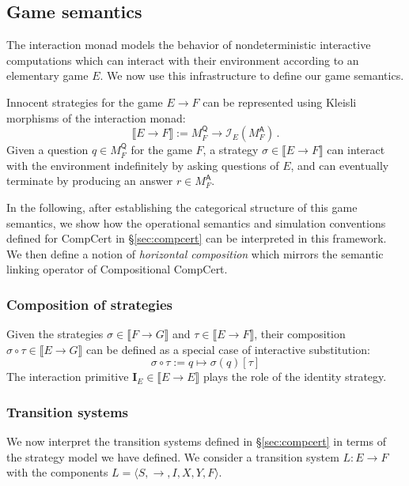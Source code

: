 \documentclass[sigplan,10pt,review,anonymous]{acmart}
\newcommand{\kw}[1]{\ensuremath{ \mathsf{#1} }}
\begin{document}

\subsection{Game semantics}

The interaction monad
models the behavior of
nondeterministic interactive computations
which can interact with their environment
according to an elementary game $E$.
We now use this infrastructure
to define our game semantics.

Innocent strategies for the game $E \rightarrow F$
can be represented using Kleisli morphisms of
the interaction monad:
\[
  \llbracket E \rightarrow F \rrbracket :=
  M_F^\kw{Q} \rightarrow \mathcal{I}_E(M_F^\kw{A}) \,.
\]
Given a question $q \in M_F^\kw{Q}$ for the game $F$,
a strategy $\sigma \in \llbracket E \rightarrow F \rrbracket$
can interact with the environment
indefinitely by asking questions of $E$,
and can eventually terminate by producing an answer $r \in M_F^\kw{A}$.

In the following,
after establishing the categorical structure
of this game semantics,
we show how
the operational semantics
and simulation conventions
defined for CompCert in \S\ref{sec:compcert}
can be interpreted in this framework.
We then define a notion of \emph{horizontal composition}
which mirrors the semantic linking operator
of Compositional CompCert.

\subsubsection{Composition of strategies}

Given the strategies
$\sigma \in \llbracket F \rightarrow G \rrbracket$ and
$\tau \in \llbracket E \rightarrow F \rrbracket$,
their composition
$\sigma \circ \tau \in \llbracket E \rightarrow G \rrbracket$
can be defined as a special case of interactive substitution:
\[
    \sigma \circ \tau := q \mapsto \sigma(q)[\tau]
\]
The interaction primitive
$\mathbf{I}_E \in \llbracket E \rightarrow E \rrbracket$
plays the role of the identity strategy.

\subsubsection{Transition systems}

We now interpret the transition systems defined in \S\ref{sec:compcert}
in terms of the strategy model we have defined.
We consider a transition system $L : E \rightarrow F$
with the components $L = \langle S, {\rightarrow}, I, X, Y, F \rangle$.
\end{document}

